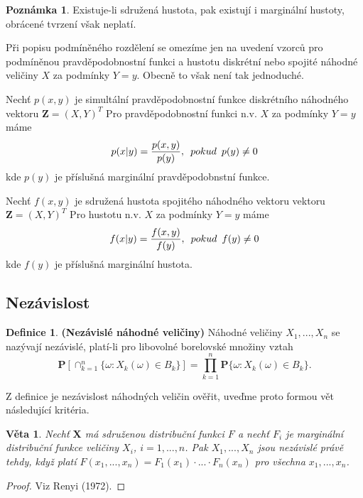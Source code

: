 \documentclass[a4]{report}
\newtheorem{theorem}{Věta}
\theoremstyle{definition}
\newtheorem{definition}{Definice}[section]
\newtheorem{remark}{Poznámka}[section]
\begin{document}
{\begin{remark}
Existuje-li sdružená hustota, pak existují i marginální hustoty, obrácené tvrzení však neplatí.
\end{remark}

Při popisu podmíněného rozdělení se omezíme jen na uvedení vzorců  pro podmíněnou pravděpodobnostní funkci a hustotu diskrétní nebo spojité náhodné veličiny $X$ za podmínky $Y = y$. Obecně to však není tak jednoduché.


Nechť $p(x,y)$ je simultální pravděpodobnostní funkce diskrétního náhodného vektoru $\textbf{Z} = (X, Y)^{T}$ Pro pravděpodobnostní funkci n.v. $X$ za podmínky $Y = y$ máme 
\begin{equation}
p(x|y) = \frac{p(x,y)}{p(y)}, \enskip pokud \enskip p(y) \neq 0
\end{equation}
kde $p(y)$ je příslušná marginální pravděpodobnstní funkce.

Nechť $f(x,y)$ je sdružená hustota spojitého náhodného vektoru vektoru $\textbf{Z} = (X, Y)^{T}$ Pro hustotu n.v. $X$ za podmínky $Y = y$ máme 
\begin{equation}
f(x|y) = \frac{f(x,y)}{f(y)}, \enskip pokud \enskip f(y) \neq 0
\end{equation}
kde $f(y)$ je příslušná marginální hustota.

\subsection{Nezávislost}
\begin{definition}{\textbf{(Nezávislé náhodné veličiny)}}
Náhodné veličiny $X_{1}, ..., X_{n}$ se nazývají nezávislé, platí-li pro libovolné borelovské množiny vztah
\begin{equation}
\textbf{P}[\cap_{k=1}^{n}\lbrace \omega : X_{k}(\omega) \in B_{k}\rbrace] = \prod_{k = 1}^{n} \textbf{P}\lbrace \omega : X_{k}(\omega) \in B_{k} \rbrace.
\end{equation}
\end{definition}

Z definice je nezávislost náhodných veličin ověřit, uveďme proto formou vět následující kritéria.
\begin{theorem}\label{Kriterium1}
Nechť $\textbf{X}$ má sdruženou distribuční funkci $F$ a nechť $F_{i}$ je marginální distribuční funkce veličiny $X_{i}$, $i = 1, ..., n$. Pak $X_{1}, ..., X_{n}$ jsou nezávislé právě tehdy, když platí $F(x_{1}, ..., x_{n}) = F_{1}(x_{1})\cdot ... \cdot F_{n}(x_{n})$ pro všechna $x_{1}, ..., x_{n}$.
\end{theorem}
\begin{proof}
Viz Renyi (1972).
\end{proof}

}
\end{document}
